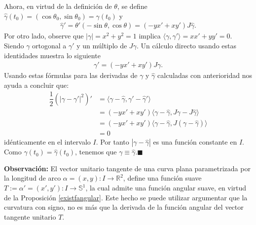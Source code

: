 \documentclass[oneside,11pt]{memoir}
\begin{document}
Ahora, en virtud de la definición de $\theta$, se define  $\hat{\gamma}(t_0)=(\cos\theta_0, \sin\theta_0)=\gamma(t_0)$ y
\begin{align*}
    \hat{\gamma}'=\theta'(-\sin\theta,\cos\theta)=(-yx'+xy')J\hat{\gamma}.
\end{align*}
Por otro lado, observe que $|\gamma|=x^2+y^2=1$ implica $\langle\gamma,\gamma'\rangle=xx'+yy'=0$. Siendo $\gamma$ ortogonal a $\gamma'$ y un múltiplo de $J\gamma$. Un cálculo directo usando estas identidades muestra lo siguiente
\begin{align*}
    \gamma'=(-yx'+xy')J\gamma.
\end{align*}
Usando estas fórmulas para las derivadas de $\gamma$ y $\hat{\gamma}$ calculadas con anterioridad nos ayuda a concluir que:
\begin{align*}
    \dfrac{1}{2}(|\gamma-\gamma'|^2)'&=\langle\gamma-\hat{\gamma}, \gamma'-\hat{\gamma}'\rangle\\
    &=(-yx'+xy')\langle\gamma-\hat{\gamma}, J\gamma-J\hat{\gamma}\rangle\\
    &=(-yx'+xy')\langle\gamma-\hat{\gamma}, J(\gamma-\hat{\gamma})\rangle\\
    &=0
\end{align*}
idénticamente en el intervalo $I$. Por tanto $|\gamma-\hat{\gamma}|$ es una función constante en $I$. Como $\gamma(t_0)=\hat{\gamma}(t_0)$, tenemos que $\gamma\equiv\hat{\gamma}$.\hfill $\blacksquare$ 

\textbf{Observación:} El vector unitario tangente de una curva plana parametrizada por la longitud
de arco $\alpha=(x, y): I \to \mathbb{R}^2$, define una función suave $T:=\alpha' = (x', y') : I \to \mathbb{S}^1$, la cual admite una función angular suave, en virtud de la Proposición \ref{existfangular}. Este hecho se puede utilizar argumentar que la curvatura con signo, no es más que la derivada de la función angular del vector tangente unitario $T$. 
\end{document}
